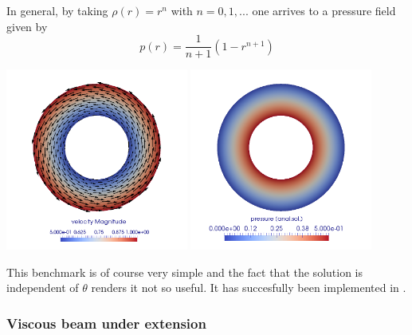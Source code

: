 In general, by taking $\rho(r)=r^n$ with $n=0,1,...$ one arrives to a pressure field given by 
\[
\boxed{
p(r)=\frac{1}{n+1} (1- r^{n+1})
}
\]

\begin{center}
\includegraphics[width=6cm]{images/benchmark_annulus_mms/vel}
\includegraphics[width=6cm]{images/benchmark_annulus_mms/press}
\end{center}

This benchmark is of course very simple and the fact that the solution is independent of $\theta$
renders it not so useful. It has succesfully been implemented in \elefant.

\subsubsection{Viscous beam under extension}

